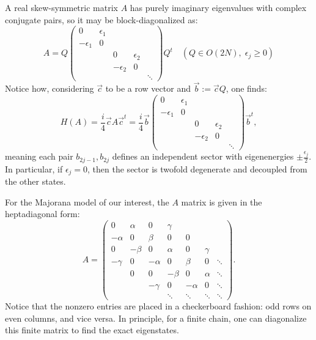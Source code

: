 \documentclass{article}
\begin{document}
A real skew-symmetric matrix $A$ has purely imaginary eigenvalues with complex conjugate pairs,
so it may be block-diagonalized as:
\[
    A = Q \begin{pmatrix}
        0           & \epsilon_1 &             &            &        \\
        -\epsilon_1 & 0          &             &            &        \\
                    &            & 0           & \epsilon_2 &        \\
                    &            & -\epsilon_2 & 0          &        \\ 
                    &            &             &            & \ddots
    \end{pmatrix} Q^t \quad
    (Q \in O(2N),\; \epsilon_j \geq 0)
\]
Notice how, considering $\vec{c}$ to be a row vector and $\vec{b} := \vec{c}Q$, one finds:
\[
    H(A) = \frac{i}{4} \vec{c} A \vec{c}^t
    = \frac{i}{4} \vec{b} \begin{pmatrix}
        0           & \epsilon_1 &             &            &        \\
        -\epsilon_1 & 0          &             &            &        \\
                    &            & 0           & \epsilon_2 &        \\
                    &            & -\epsilon_2 & 0          &        \\ 
                    &            &             &            & \ddots
    \end{pmatrix} \vec{b}^t,
\]
meaning each pair $b_{2j-1}, b_{2j}$ defines an independent sector with eigenenergies $\pm \frac{\epsilon_j}{2}$.
In particular, if $\epsilon_j = 0$, then the sector is twofold degenerate and decoupled from the other states.

For the Majorana model of our interest, the $A$ matrix is given in the heptadiagonal form:
\[
    A = \begin{pmatrix}
        0       & \alpha & 0       & \gamma  &         &        &        \\
        -\alpha & 0      & \beta   & 0       & 0       &        &        \\
        0       & -\beta & 0       & \alpha  & 0       & \gamma &        \\
        -\gamma & 0      & -\alpha & 0       & \beta   & 0      & \ddots \\
                & 0      & 0       & -\beta  & 0       & \alpha & \ddots \\
                &        & -\gamma & 0       & -\alpha & 0      & \ddots \\
                &        &         & \ddots  & \ddots  & \ddots & \ddots
    \end{pmatrix}.
\]
Notice that the nonzero entries are placed in a checkerboard fashion: odd rows on even columns, and vice versa.
In principle, for a finite chain, one can diagonalize this finite matrix to find the exact eigenstates.
\end{document}
